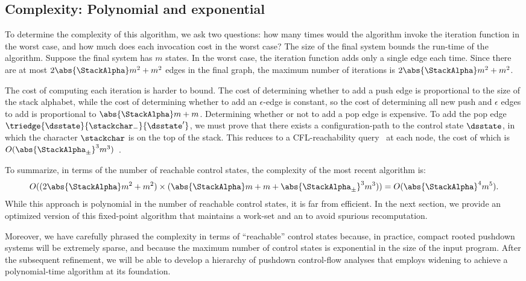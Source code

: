 


\subsection{Complexity: Polynomial and exponential}
\label{sec:compl-pol-exp}
 
To determine the complexity of this algorithm, we ask two questions:
how many times would the algorithm invoke the iteration function in
the worst case, and how much does each invocation cost in the
worst case?
The size of the final system bounds the run-time of the algorithm.
Suppose the final system has $m$ states.
In the worst case, the iteration function adds only a single edge each
time.
Since there are at most $2\abs{\StackAlpha}m^2 + m^2$ edges in the final graph, the maximum
number of iterations is $2\abs{\StackAlpha}m^2 + m^2$.


The cost of computing each iteration is harder to bound.
The cost of determining whether to add a push edge is proportional to
the size of the stack alphabet, while the cost of determining whether
to add an $\epsilon$-edge is constant, so the cost of determining all
new push and $\epsilon$ edges to add is proportional to $\abs{\StackAlpha}m +
m$.
Determining whether or not to add a pop edge is expensive.
To add the pop edge
$\triedge{\dsstate}{\stackchar_-}{\dsstate'}$, we must prove that
there exists a configuration-path to the control state $\dsstate$, in which
the character $\stackchar$ is on the top of the stack.
This reduces to a CFL-reachability query~\cite{mattmight:Melski:2000:CFL}
at each node, the cost of which is $O(\abs{\StackAlpha_\pm}^3
m^3)$~\cite{dvanhorn:Kodumal2004Set}.

To summarize, in terms of the number of reachable control states, the
complexity of the most recent algorithm is:
\[
O((2\abs{\StackAlpha}m^2 + m^2) 
  \times
  (\abs{\StackAlpha}m + m
  + \abs{\StackAlpha_\pm}^3m^3)) 
  =  O(\abs{\StackAlpha}^4m^5)\text.
\]
While this approach is polynomial in the number of reachable
control states, it is far from efficient.
In the next section, we provide an optimized version of this
fixed-point algorithm that maintains a work-set and an
\ecg{} to avoid spurious recomputation.

Moreover, we have carefully phrased the complexity in terms of
``reachable'' control states because, in practice, compact rooted
pushdown systems will be extremely sparse, and because the maximum
number of control states is exponential in the size of the input
program.
After the subsequent refinement, we will be able to develop a hierarchy of
pushdown control-flow analyses that employs widening to achieve a
polynomial-time algorithm at its foundation.



